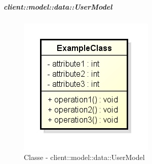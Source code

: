 		\subparagraph{client::model::data::UserModel} %
		\label{subp:client_model_data_user}
			\begin{figure}[htbp]
				\centering
				\centerline{\includegraphics[scale=0.7]{./images/client/classes/example_class.png}}
				\caption{Classe - client::model::data::UserModel}
			\end{figure}
